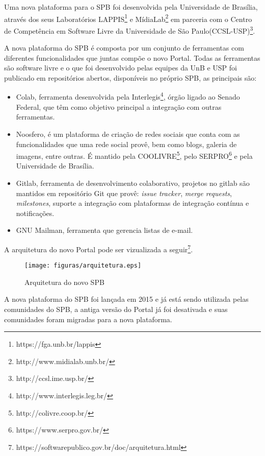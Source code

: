 Uma nova plataforma para o SPB foi desenvolvida
pela Universidade de Brasília, através dos seus Laboratórios LAPPIS\footnote{https://fga.unb.br/lappis} 
e MídiaLab\footnote{http://www.midialab.unb.br/} 
em parceria com o Centro de Competência em Software Livre da Universidade de São Paulo(CCSL-USP)\footnote{http://ccsl.ime.usp.br/}.

A nova plataforma do SPB é composta por um conjunto de ferramentas com diferentes funcionalidades
que juntas compõe o novo Portal. Todas as ferramentas são software livre e o que foi desenvolvido pelas equipes da UnB e 
USP foi publicado em repositórios abertos, disponíveis no próprio SPB, as principais são:
\begin{itemize}

\item Colab, ferramenta desenvolvida pela Interlegis\footnote{http://www.interlegis.leg.br/}, órgão ligado 
ao Senado Federal, que têm como objetivo principal a integração com outras ferramentas.

\item Noosfero, é um plataforma de criação de redes sociais que conta com as funcionalidades
que uma rede social provê, bem como blogs, galeria de imagens, entre outras. É mantido pela 
COOLIVRE\footnote{http://colivre.coop.br/}, pelo SERPRO\footnote{https://www.serpro.gov.br/} e pela
Universidade de Brasília.

\item Gitlab, ferramenta de desenvolvimento colaborativo, projetos no gitlab são mantidos em 
repositório Git que provê: \textit{issue tracker}, \textit{merge requests}, 
\textit{milestones}, suporte a integração com plataformas de integração contínua e notificações.

\item GNU Mailman, ferramenta que gerencia listas de e-mail.

\end{itemize}

A arquitetura do novo Portal pode ser vizualizada a seguir\footnote{https://softwarepublico.gov.br/doc/arquitetura.html}.

\begin{figure}[h]
	\centering
	\label{arquitetura}
		\texttt{[image: figuras/arquitetura.eps]}
	\caption{Arquitetura do novo SPB}
\end{figure}


A nova plataforma do SPB foi lançada em 2015 e já está sendo utilizada pelas comunidades
do SPB, a antiga versão do Portal já foi desativada e suas comunidades foram 
migradas para a nova plataforma. 

